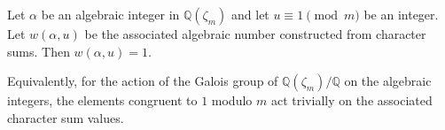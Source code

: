Let $\alpha$ be an algebraic integer in $\mathbb{Q}(\zeta_m)$ and let $u \equiv 1 \pmod{m}$ be an integer. Let $w(\alpha, u)$ be the associated algebraic number constructed from character sums. Then $w(\alpha, u) = 1$.

Equivalently, for the action of the Galois group of $\mathbb{Q}(\zeta_m)/\mathbb{Q}$ on the algebraic integers, the elements congruent to $1$ modulo $m$ act trivially on the associated character sum values.
